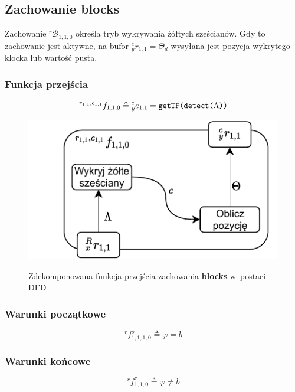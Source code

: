 \subsection{Zachowanie blocks}
\label{subsec:vr-camera-blocks}
Zachowanie ${}^{r}\mathcal{B}_{1,1,0}$ określa tryb wykrywania żółtych sześcianów. Gdy to zachowanie jest aktywne, na bufor ${}^{c}_{y}r_{1,1} = \Theta_{d}$ wysyłana jest pozycja wykrytego klocka lub wartość pusta. 

\subsubsection{Funkcja przejścia}
\begin{equation}
    {}^{r_{1,1}, c_{1,1}}f_{1,1,0} \triangleq {}^{c}_{y}e_{1,1} = \text{\texttt{getTF(detect(}}\Lambda\text{\texttt{))}}    
\end{equation}

\begin{figure}[ht]
    \centering
    \includegraphics[width=\columnwidth]{figures/ISR-vr-camera-fp-blocks.pdf}
    \label{fig:vr-camera-fp-blocks}
    \caption{Zdekomponowana funkcja przejścia zachowania \textbf{blocks} w~postaci DFD}
\end{figure}

\subsubsection{Warunki początkowe}
\begin{equation}
    {}^{r}f^{\sigma}_{1,1,1,0} \triangleq \varphi = b
\end{equation}

\subsubsection{Warunki końcowe}
\begin{equation}
    {}^{r}f^{\tau}_{1,1,0} \triangleq \varphi \neq b
\end{equation}

